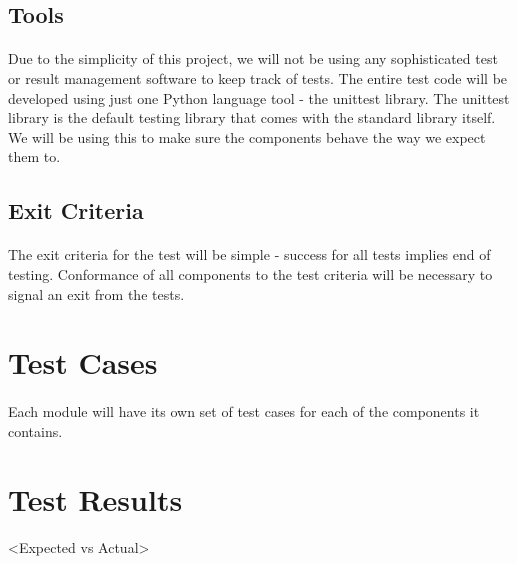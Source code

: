 \subsection{Tools}
\paragraph{}
Due to the simplicity of this project, we will not be using any sophisticated test or result management software to keep track of tests. The entire test code will be developed using just one Python language tool - the unittest library. The unittest library is the default testing library that comes with the standard library itself. We will be using this to make sure the components behave the way we expect them to.

\subsection{Exit Criteria}
\paragraph{}
The exit criteria for the test will be simple - success for all tests implies end of testing. Conformance of all components to the test criteria will be necessary to signal an exit from the tests.

\section{Test Cases}
\paragraph{}
Each module will have its own set of test cases for each of the components it contains.

\section{Test Results}
<Expected vs Actual>
